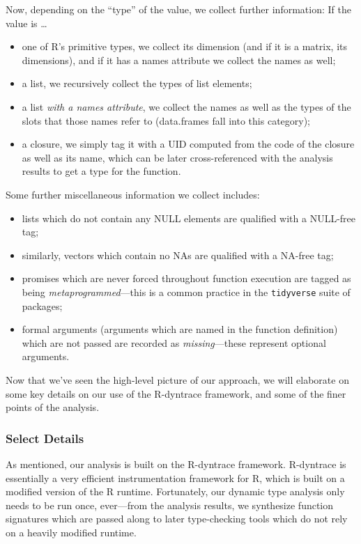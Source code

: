 \documentclass[acmsmall,review,anonymous]{acmart}\settopmatter{printfolios=true,printccs=false,printacmref=false}
\begin{document}
Now, depending on the ``type'' of the value, we collect further information:
If the value is \ldots

\begin{itemize}
\item one of R's primitive types, we collect its dimension (and if it is a matrix, its dimensions), and if it has a names attribute we collect the names as well;
\item a list, we recursively collect the types of list elements;
\item a list {\it with a names attribute}, we collect the names as well as the types of the slots that those names refer to (data.frames fall into this category);
\item a closure, we simply tag it with a UID computed from the code of the closure as well as its name, which can be later cross-referenced with the analysis results to get a type for the function.
\end{itemize}

Some further miscellaneous information we collect includes:

\begin{itemize}
\item lists which do not contain any NULL elements are qualified with a NULL-free tag; 
\item similarly, vectors which contain no NAs are qualified with a NA-free tag;
\item promises which are never forced throughout function execution are tagged as being {\it metaprogrammed}---this is a common practice in the {\tt tidyverse} suite of packages;
\item formal arguments (arguments which are named in the function definition) which are not passed are recorded as {\it missing}---these represent optional arguments.
\end{itemize}

Now that we've seen the high-level picture of our approach, we will elaborate on some key details on our use of the R-dyntrace framework, and some of the finer points of the analysis.

%
%
\subsubsection{Select Details}

As mentioned, our analysis is built on the R-dyntrace framework.
R-dyntrace is essentially a very efficient instrumentation framework for R, which is built on a modified version of the R runtime.
Fortunately, our dynamic type analysis only needs to be run once, ever---from the analysis results, we synthesize function signatures which are passed along to later type-checking tools which do not rely on a heavily modified runtime. 
\end{document}

